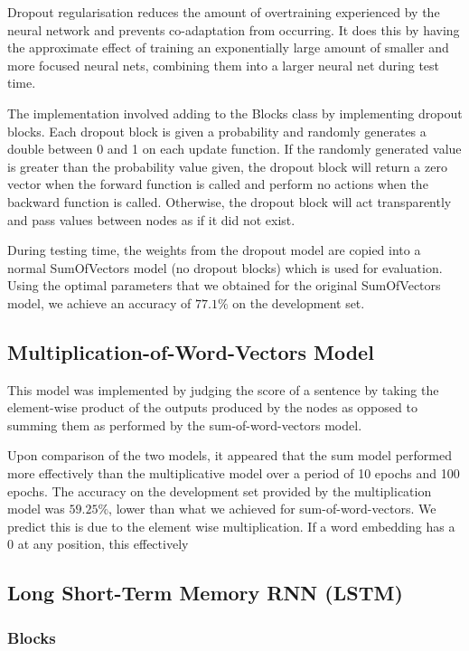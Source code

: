 \documentclass{article} %
\begin{document}
Dropout regularisation reduces the amount of overtraining experienced by the neural network and prevents co-adaptation  from occurring. It does this by having the approximate effect of training an exponentially large amount of smaller and more focused neural nets, combining them into a larger neural net during test time.

The implementation involved adding to the Blocks class by implementing dropout blocks. Each dropout block is given a probability and randomly generates a double between 0 and 1 on each update function. If the randomly generated value is greater than the probability value given, the dropout block will return a zero vector when the forward function is called and perform no actions when the backward function is called. Otherwise, the dropout block will act transparently and pass values between nodes as if it did not exist.

During testing time, the weights from the dropout model are copied into a normal SumOfVectors model (no dropout blocks) which is used for evaluation. Using the optimal parameters that we obtained for the original SumOfVectors model, we achieve an accuracy of $77.1\%$ on the development set.

\subsection{Multiplication-of-Word-Vectors Model}

This model was implemented by judging the score of a sentence by taking the element-wise product of the outputs produced by the nodes as opposed to summing them as performed by the sum-of-word-vectors model. 

Upon comparison of the two models, it appeared that the sum model performed more effectively than the multiplicative model over a period of 10 epochs and 100 epochs. The accuracy on the development set provided by the multiplication model was $59.25\%$, lower than what we achieved for sum-of-word-vectors. We predict this is due to the element wise multiplication. If a word embedding has a $0$ at any position, this effectively 

\subsection{Long Short-Term Memory RNN (LSTM)}

\subsubsection{Blocks}
\end{document}
